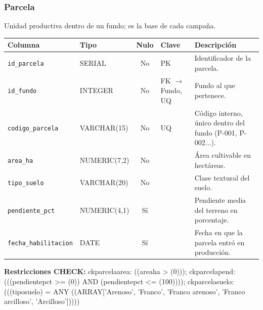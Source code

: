 \documentclass[11pt,letterpaper]{article}
\newcommand{\tbus}{\textunderscore\allowbreak}
\newcommand{\tb}[1]{{\ttfamily\let\_\tbus #1}}
\begin{document}
\subsubsection*{Parcela}
Unidad productiva dentro de un fundo; es la base de cada campaña.
{\footnotesize
\begin{longtable}{>{\raggedright\arraybackslash}p{3.3cm}>{\raggedright\arraybackslash}p{2.5cm}c>{\raggedright\arraybackslash}p{2.2cm}>{\raggedright\arraybackslash}p{6.1cm}}
\toprule
\textbf{Columna} & \textbf{Tipo} & \textbf{Nulo} & \textbf{Clave} & \textbf{Descripción} \\
\midrule
\endhead
\texttt{id\_parcela} & SERIAL & No & PK & Identificador de la parcela. \\
\texttt{id\_fundo} & INTEGER & No & FK $\to$ Fundo, UQ & Fundo al que pertenece. \\
\texttt{codigo\_parcela} & VARCHAR(15) & No & UQ & Código interno, único dentro del fundo (P-001, P-002...). \\
\texttt{area\_ha} & NUMERIC(7,2) & No &  & Área cultivable en hectáreas. \\
\texttt{tipo\_suelo} & VARCHAR(20) & No &  & Clase textural del suelo. \\
\texttt{pendiente\_pct} & NUMERIC(4,1) & Sí &  & Pendiente media del terreno en porcentaje. \\
\texttt{fecha\_habilitacion} & DATE & Sí &  & Fecha en que la parcela entró en producción. \\
\bottomrule
\end{longtable}}
{\footnotesize\textbf{Restricciones CHECK:} \tb{ck\_parcela\_area}: \tb{((area\_ha > (0)))}; \tb{ck\_parcela\_pend}: \tb{(((pendiente\_pct >= (0)) AND (pendiente\_pct <= (100))))}; \tb{ck\_parcela\_suelo}: \tb{(((tipo\_suelo) = ANY ((ARRAY['Arenoso', 'Franco', 'Franco arenoso', 'Franco arcilloso', 'Arcilloso']))))}\par}
\medskip
\end{document}

